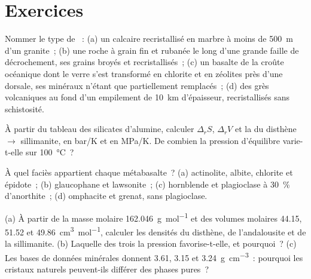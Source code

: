 \section{Exercices}

\begin{exercise}[$\star$]\label{exo:b2:metamorphic-facies:1}
Nommer le type de ~: (a) un calcaire recristallisé en marbre à moins de
\qty{500}{m} d'un granite~; (b) une roche à grain fin et rubanée le long d'une grande faille de décrochement,
ses grains broyés et recristallisés~; (c) un basalte de la croûte océanique dont le
verre s'est transformé en chlorite et en zéolites près d'une dorsale, ses minéraux n'étant que partiellement
remplacés~; (d) des grès volcaniques au fond d'un empilement de \qty{10}{km} d'épaisseur,
recristallisés sans schistosité.
\end{exercise}

\begin{exercise}[$\star$]\label{exo:b2:metamorphic-facies:2}
À partir du tableau des silicates d'alumine, calculer $\Delta_r S$, $\Delta_r V$ et la
 du disthène $\to$ sillimanite, en \unit{bar/K} et en \unit{MPa/K}. De combien
la pression d'équilibre varie-t-elle sur \qty{100}{\celsius}~?
\end{exercise}

\begin{exercise}[$\star$]\label{exo:b2:metamorphic-facies:3}
À quel faciès appartient chaque métabasalte~? (a) actinolite, albite, chlorite et
épidote~; (b) glaucophane et lawsonite~; (c) hornblende et plagioclase à
\qty{30}{\percent} d'anorthite~; (d) omphacite et grenat, sans plagioclase.
\end{exercise}

\begin{exercise}[$\star$]\label{exo:b2:metamorphic-facies:4}
(a) À partir de la masse molaire \qty{162.046}{g.mol^{-1}} et des volumes molaires 44.15, 51.52 et
\qty{49.86}{cm^3.mol^{-1}}, calculer les densités du disthène, de l'andalousite et de la sillimanite.
(b) Laquelle des trois la pression favorise-t-elle, et pourquoi~? (c) Les bases de données minérales donnent 3.61, 3.15 et
\qty{3.24}{g.cm^{-3}}~: pourquoi les cristaux naturels peuvent-ils différer des phases pures~?
\end{exercise}

